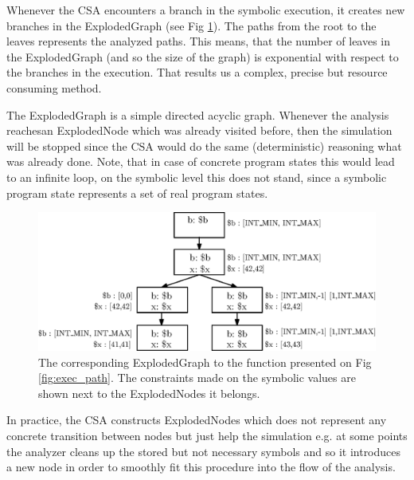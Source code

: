 \documentclass[oneside, a4paper, 12pt]{article}
\theoremstyle{definition}
\begin{document}
Whenever the CSA encounters a branch in the symbolic execution, it creates new 
branches in the ExplodedGraph (see Fig \ref{fig:exploded_graph}). The paths
from the root to the leaves represents the analyzed paths. This means, that the 
number of leaves in the ExplodedGraph (and so the size of the graph) is 
exponential with respect to the branches in the execution. That results us a 
complex, precise but resource consuming method.

The ExplodedGraph is a simple directed acyclic graph. Whenever the analysis 
reachesan ExplodedNode which was already visited before, then the simulation 
will be stopped since the CSA would do the same (deterministic) reasoning what 
was already done. Note, that in case of concrete program states this would lead 
to an infinite loop, on the symbolic level this does not stand, since a
symbolic program state represents a set of real program states.

\begin{figure}[h]
	\centering
	\includegraphics[width=1\textwidth]{img/explodedgraph.eps}
	\caption{The corresponding ExplodedGraph to the function presented on Fig 
		\ref{fig:exec_path}. The constraints made on the symbolic values are 
		shown next to the ExplodedNodes it belongs.}
	\label{fig:exploded_graph}
\end{figure}

In practice, the CSA constructs ExplodedNodes which does not represent any 
concrete transition between nodes but just help the simulation e.g. at some 
points the analyzer cleans up the stored but not necessary symbols and so it 
introduces a new node in order to smoothly fit this procedure into the flow of 
the analysis.
\end{document}
